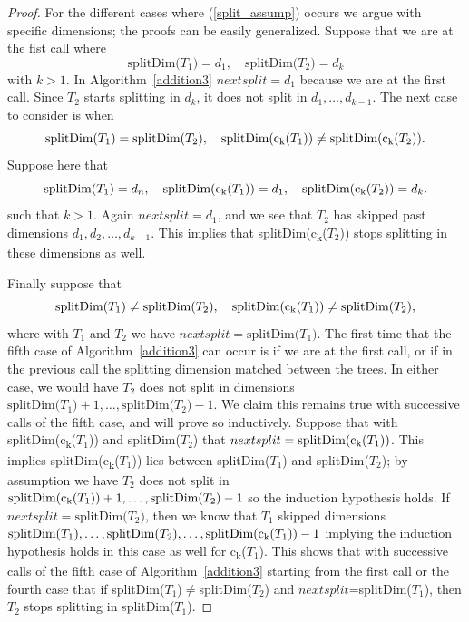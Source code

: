 \documentclass{article}
\newcommand{\child}[1]{c\textsubscript{#1}}
\begin{document}
\begin{proof}
For the different cases where (\ref{split_assump}) occurs we argue with specific dimensions; the proofs can be easily generalized. Suppose that we are at the fist call where
\begin{equation}
 \text{splitDim($T_1$)}=d_1 , \quad \text{splitDim($T_2$)}=d_k
\end{equation}
with $k>1$. In Algorithm~\ref{addition3} $nextsplit=d_1$ because we are at the first call. Since $T_2$ starts splitting in $d_k$, it does not split in $d_1,\dots,d_{k-1}$. The next case to consider is when 
\begin{equation}
\text{splitDim($T_1$)}=\text{splitDim($T_2$)}, \quad \text{splitDim(\child{k}($T_1$))} \neq \text{splitDim(\child{k}($T_2$))}.
\end{equation}
Suppose here that
\begin{equation}
\text{splitDim($T_1$)}=d_n, \quad \text{splitDim(\child{k}($T_1$))}=d_1, \quad \text{splitDim(\child{k}($T_2$))}=d_k.
\end{equation}
such that $k>1$. Again $nextsplit=d_1$, and we see that $T_2$ has skipped past dimensions $d_1,d_2,\dots,d_{k-1}$. This implies that splitDim(\child{k}($T_2$)) stops splitting in these dimensions as well.

Finally suppose that 
\begin{equation}
\text{splitDim($T_1$)} \neq \text{splitDim($T_2$)}, \quad  \text{splitDim(\child{k}($T_1$))} \neq \text{splitDim($T_2$)},
\end{equation}
where with $T_1$ and $T_2$ we have $nextsplit=\text{splitDim($T_1$)}$. The first time that the fifth case of Algorithm~\ref{addition3} can occur is if we are at the first call, or if in the previous call the splitting dimension matched between the trees. In either case, we would have $T_2$ does not split in dimensions $\text{splitDim($T_1$)}+1,\dots,\text{splitDim($T_2$)}-1$. We claim this remains true with successive calls of the fifth case, and will prove so inductively. Suppose that with splitDim(\child{k}($T_1$)) and splitDim($T_2$) that $nextsplit=\text{splitDim(\child{k}($T_1$))}$. This implies splitDim(\child{k}($T_1$)) lies between splitDim($T_1$) and splitDim($T_2$); by assumption we have $T_2$ does not split in $\text{splitDim(\child{k}($T_1$))}+1,\dots,\text{splitDim($T_2$)}-1$ so the induction hypothesis holds. If $nextsplit=\text{splitDim($T_2$)}$, then we know that $T_1$ skipped dimensions $\text{splitDim($T_1$)},\dots,\text{splitDim($T_2$)},\dots,\text{splitDim(\child{k}($T_1$))}-1$ implying the induction hypothesis holds in this case as well for \child{k}($T_1$). This shows that with successive calls of the fifth case of Algorithm~\ref{addition3} starting from the first call or the fourth case that if splitDim($T_1$)$\neq$splitDim($T_2$) and $nextsplit$=splitDim($T_1$), then $T_2$ stops splitting in splitDim($T_1$).

\end{proof}
\end{document}
